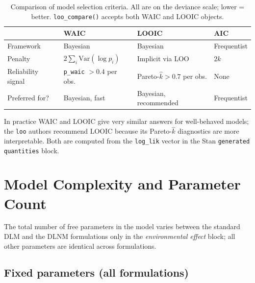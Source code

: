 \documentclass[12pt,a4paper]{article}
\begin{document}
\begin{table}[ht]
\centering
\small
\begin{tabular}{p{2.5cm}p{4.5cm}p{4.5cm}p{2.5cm}}
\toprule
 & \textbf{WAIC} & \textbf{LOOIC} & \textbf{AIC} \\
\midrule
Framework & Bayesian & Bayesian & Frequentist \\
Penalty & $2\sum_i \text{Var}(\log p_i)$ & Implicit via LOO & $2k$ \\
Reliability signal & \texttt{p\_waic} $> 0.4$ per obs. & Pareto-$\hat{k} > 0.7$ per obs. & None \\
Preferred for? & Bayesian, fast & Bayesian, recommended & Frequentist \\
\bottomrule
\end{tabular}
\caption{Comparison of model selection criteria. All are on the deviance scale; lower = better.
         \texttt{loo\_compare()} accepts both WAIC and LOOIC objects.}
\end{table}

In practice WAIC and LOOIC give very similar answers for well-behaved models; the \texttt{loo} authors recommend LOOIC because its Pareto-$\hat{k}$ diagnostics are more interpretable. Both are computed from the \texttt{log\_lik} vector in the Stan \texttt{generated quantities} block.

\section{Model Complexity and Parameter Count}
\label{sec:params}

The total number of free parameters in the model varies between the standard DLM and the DLNM formulations only in the \emph{environmental effect} block; all other parameters are identical across formulations.

\subsection*{Fixed parameters (all formulations)}
\end{document}
